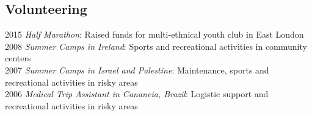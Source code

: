 \documentclass[margin]{res}
\begin{document}
\begin{resume}
\section{Volunteering}
    2015 \textit{Half Marathon}: {Raised funds for multi-ethnical youth club in East London} \\
    2008 \textit{Summer Camps in Ireland}: {Sports and recreational activities in community centers} \\
    2007 \textit{Summer Camps in Israel and Palestine}: {Maintenance, sports and recreational activities in risky areas} \\
    2006 \textit{Medical Trip Assistant in Cananeia, Brazil}: {Logistic support and recreational activities in risky areas} \\

\end{resume} 
\end{document}
